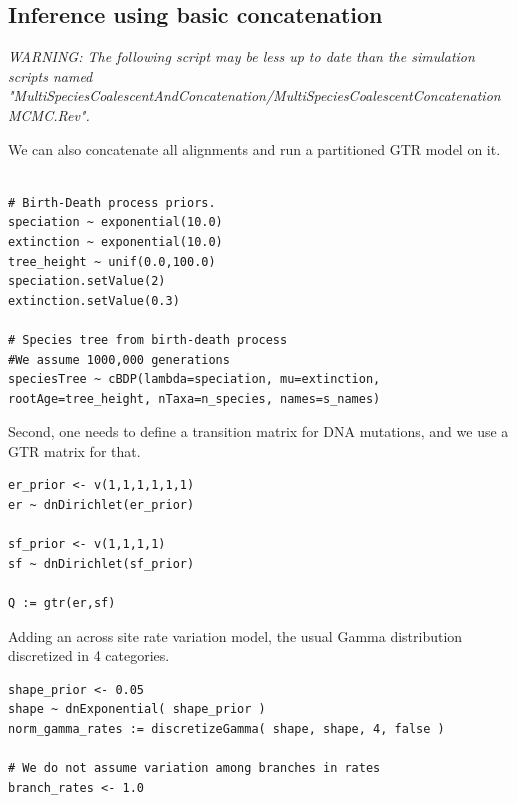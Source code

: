 \documentclass[11pt]{article}
\begin{document}
\subsection{Inference using basic concatenation }

{\begin{framed}
\begin{center}
\emph{WARNING: The following script may be less up to date than the simulation scripts named "MultiSpeciesCoalescentAndConcatenation/MultiSpeciesCoalescentConcatenationMCMC.Rev".}
\end{center}
\end{framed}}
\vspace{5mm}
We can also concatenate all alignments and run a partitioned GTR model on it.


 {\begin{framed}
 {\tt \begin{snugshade*}
\begin{lstlisting}

# Birth-Death process priors.
speciation ~ exponential(10.0)
extinction ~ exponential(10.0)
tree_height ~ unif(0.0,100.0)
speciation.setValue(2)
extinction.setValue(0.3)

# Species tree from birth-death process
#We assume 1000,000 generations
speciesTree ~ cBDP(lambda=speciation, mu=extinction, rootAge=tree_height, nTaxa=n_species, names=s_names)
\end{lstlisting}
\end{snugshade*}}
Second, one needs to define a transition matrix for DNA mutations, and we use a GTR matrix for that.

 {\tt \begin{snugshade*}
\begin{lstlisting}
er_prior <- v(1,1,1,1,1,1)
er ~ dnDirichlet(er_prior)

sf_prior <- v(1,1,1,1)
sf ~ dnDirichlet(sf_prior)

Q := gtr(er,sf) 
\end{lstlisting}
\end{snugshade*}}

Adding an across site rate variation model, the usual Gamma distribution discretized in 4 categories.
 {\tt \begin{snugshade*}
\begin{lstlisting}
shape_prior <- 0.05 
shape ~ dnExponential( shape_prior )
norm_gamma_rates := discretizeGamma( shape, shape, 4, false )

# We do not assume variation among branches in rates
branch_rates <- 1.0


\end{lstlisting}
\end{snugshade*}}
\end{framed}}
\end{document}
